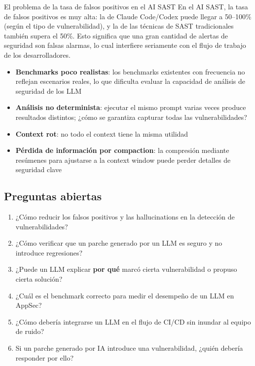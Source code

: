 \documentclass[a4paper]{article}
\begin{document}
\begin{warningbox}{El problema de la tasa de falsos positivos en el AI SAST}
En el AI SAST, la tasa de falsos positivos es muy alta: la de Claude Code/Codex puede llegar a 50--100\% (según el tipo de vulnerabilidad), y la de las técnicas de SAST tradicionales también supera el 50\%. Esto significa que una gran cantidad de alertas de seguridad son falsas alarmas, lo cual interfiere seriamente con el flujo de trabajo de los desarrolladores.
\end{warningbox}

\begin{itemize}
    \item \textbf{Benchmarks poco realistas}: los benchmarks existentes con frecuencia no reflejan escenarios reales, lo que dificulta evaluar la capacidad de análisis de seguridad de los LLM
    \item \textbf{Análisis no determinista}: ejecutar el mismo prompt varias veces produce resultados distintos; ¿cómo se garantiza capturar todas las vulnerabilidades?
    \item \textbf{Context rot}: no todo el context tiene la misma utilidad
    \item \textbf{Pérdida de información por compaction}: la compresión mediante resúmenes para ajustarse a la context window puede perder detalles de seguridad clave
\end{itemize}

\subsection{Preguntas abiertas}

\begin{enumerate}
    \item ¿Cómo reducir los falsos positivos y las hallucinations en la detección de vulnerabilidades?
    \item ¿Cómo verificar que un parche generado por un LLM es seguro y no introduce regresiones?
    \item ¿Puede un LLM explicar \textbf{por qué} marcó cierta vulnerabilidad o propuso cierta solución?
    \item ¿Cuál es el benchmark correcto para medir el desempeño de un LLM en AppSec?
    \item ¿Cómo debería integrarse un LLM en el flujo de CI/CD sin inundar al equipo de ruido?
    \item Si un parche generado por IA introduce una vulnerabilidad, ¿quién debería responder por ello?
\end{enumerate}
\end{document}
